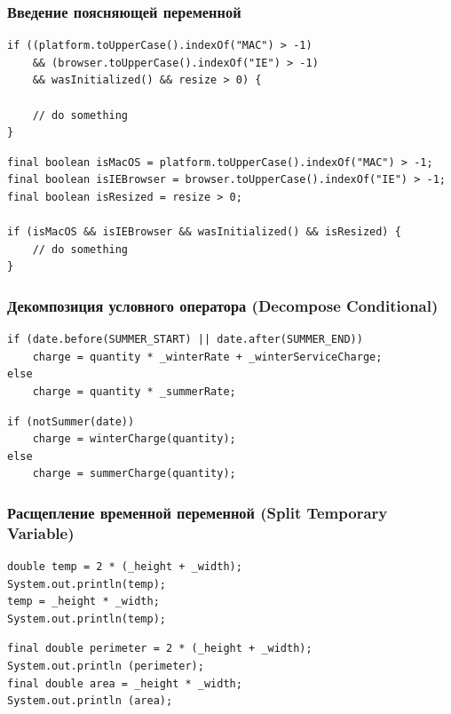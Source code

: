 \documentclass{../../slides-style}
\begin{document}
    \begin{frame}[fragile]
        \frametitle{Введение поясняющей переменной}
        \begin{verbatim}
if ((platform.toUpperCase().indexOf("MAC") > -1)
    && (browser.toUpperCase().indexOf("IE") > -1)
    && wasInitialized() && resize > 0) {

    // do something
}
        \end{verbatim}
        
        \hspace{2cm}{\Huge{$\Downarrow$}}
        
        \begin{verbatim}
final boolean isMacOS = platform.toUpperCase().indexOf("MAC") > -1;
final boolean isIEBrowser = browser.toUpperCase().indexOf("IE") > -1;
final boolean isResized = resize > 0;

if (isMacOS && isIEBrowser && wasInitialized() && isResized) {
    // do something
}
        \end{verbatim}
    \end{frame}

    \begin{frame}[fragile]
        \frametitle{Декомпозиция условного оператора (Decompose Conditional)}
        \begin{verbatim}
if (date.before(SUMMER_START) || date.after(SUMMER_END))
    charge = quantity * _winterRate + _winterServiceCharge;
else
    charge = quantity * _summerRate;
        \end{verbatim}
        
        \hspace{2cm}{\Huge{$\Downarrow$}}
        
        \begin{verbatim}
if (notSummer(date))
    charge = winterCharge(quantity);
else
    charge = summerCharge(quantity);
        \end{verbatim}
    \end{frame}

    \begin{frame}[fragile]
        \frametitle{Расщепление временной переменной (Split Temporary Variable)}
        \begin{verbatim}
double temp = 2 * (_height + _width);
System.out.println(temp);
temp = _height * _width;
System.out.println(temp);
        \end{verbatim}
        
        \hspace{2cm}{\Huge{$\Downarrow$}}
        
        \begin{verbatim}
final double perimeter = 2 * (_height + _width);
System.out.println (perimeter);
final double area = _height * _width;
System.out.println (area);
        \end{verbatim}
    \end{frame}
\end{document}
